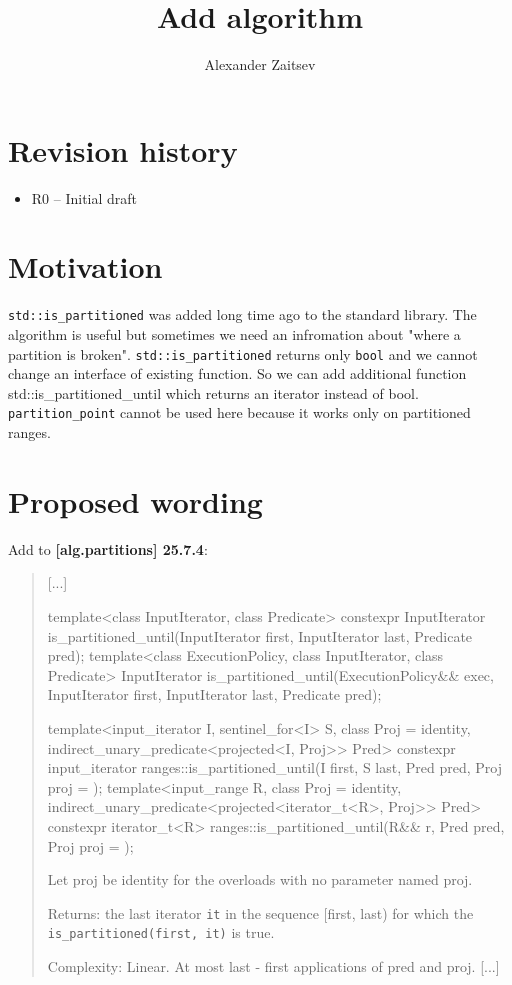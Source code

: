 \documentclass{wg21}
\title{Add \cc{std::is_partitioned_until} algorithm}
\author{Alexander Zaitsev}{zamazan4ik@tut.by, zamazan4ik@gmail.com}
\newcommand{\cc}[1]{\texttt{#1}}
\begin{document}
\maketitle

\section{Revision history}
\begin{itemize}
  \item R0 -- Initial draft
\end{itemize}

\section{Motivation}
\cc{std::is_partitioned} was added long time ago to the standard library. The algorithm is useful but sometimes we need an infromation about "where a partition is broken". \cc{std::is_partitioned} returns only \cc{bool} and we cannot change an interface of existing function. So we can add additional function {std::is_partitioned_until} which returns an iterator instead of bool. \cc{partition_point} cannot be used here because it works only on partitioned ranges.

\section{Proposed wording}
Add to \textbf{[alg.partitions] 25.7.4}:
\begin{quote}
[...]	
\begin{itemdecl}
template<class InputIterator, class Predicate>
  constexpr InputIterator is_partitioned_until(InputIterator first, InputIterator last,
                                               Predicate pred);
template<class ExecutionPolicy, class InputIterator, class Predicate>
  InputIterator is_partitioned_until(ExecutionPolicy&& exec, InputIterator first,
                                     InputIterator last, Predicate pred);
\end{itemdecl}

\begin{itemdecl}
template<input_iterator I, sentinel_for<I> S, class Proj = identity,
         indirect_unary_predicate<projected<I, Proj>> Pred>
  constexpr input_iterator ranges::is_partitioned_until(I first, S last, Pred pred,
                                                        Proj proj = {});	
template<input_range R, class Proj = identity, 
         indirect_unary_predicate<projected<iterator_t<R>, Proj>> Pred>
  constexpr iterator_t<R> ranges::is_partitioned_until(R&& r, Pred pred, Proj proj = {});
\end{itemdecl}
    Let proj be identity{} for the overloads with no parameter named proj.
    
    Returns: the last iterator \cc{it} in the sequence [first, last) for which the \cc{is_partitioned(first, it)} is true.
    
    Complexity: Linear. At most last - first applications of pred and proj.
[...]
\end{quote}
\end{document}
